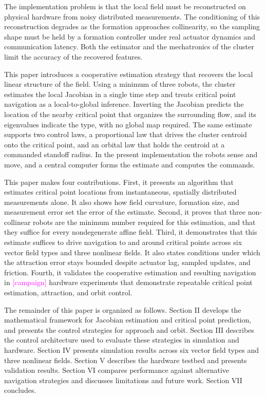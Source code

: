 \documentclass[lettersize,journal]{IEEEtran}
\newcommand{\open}[1]{\textcolor{magenta}{[#1]}}     %
\begin{document}
The implementation problem is that the local field must be reconstructed on physical hardware from noisy distributed measurements. The conditioning of this reconstruction degrades as the formation approaches collinearity, so the sampling shape must be held by a formation controller under real actuator dynamics and communication latency. Both the estimator and the mechatronics of the cluster limit the accuracy of the recovered features.

This paper introduces a cooperative estimation strategy that recovers the local linear structure of the field. Using a minimum of three robots, the cluster estimates the local Jacobian in a single time step and treats critical point navigation as a local-to-global inference. Inverting the Jacobian predicts the location of the nearby critical point that organizes the surrounding flow, and its eigenvalues indicate the type, with no global map required. The same estimate supports two control laws, a proportional law that drives the cluster centroid onto the critical point, and an orbital law that holds the centroid at a commanded standoff radius. In the present implementation the robots sense and move, and a central computer forms the estimate and computes the commands.

This paper makes four contributions. First, it presents an algorithm that estimates critical point locations from instantaneous, spatially distributed measurements alone. It also shows how field curvature, formation size, and measurement error set the error of the estimate. Second, it proves that three non-collinear robots are the minimum number required for this estimation, and that they suffice for every nondegenerate affine field. Third, it demonstrates that this estimate suffices to drive navigation to and around critical points across six vector field types and three nonlinear fields. It also states conditions under which the attraction error stays bounded despite actuator lag, sampled updates, and friction. Fourth, it validates the cooperative estimation and resulting navigation in \open{campaign} hardware experiments that demonstrate repeatable critical point estimation, attraction, and orbit control. %

The remainder of this paper is organized as follows. Section II develops the mathematical framework for Jacobian estimation and critical point prediction, and presents the control strategies for approach and orbit. Section III describes the control architecture used to evaluate these strategies in simulation and hardware. Section IV presents simulation results across six vector field types and three nonlinear fields. Section V describes the hardware testbed and presents validation results. Section VI compares performance against alternative navigation strategies and discusses limitations and future work. Section VII concludes.
\end{document}
